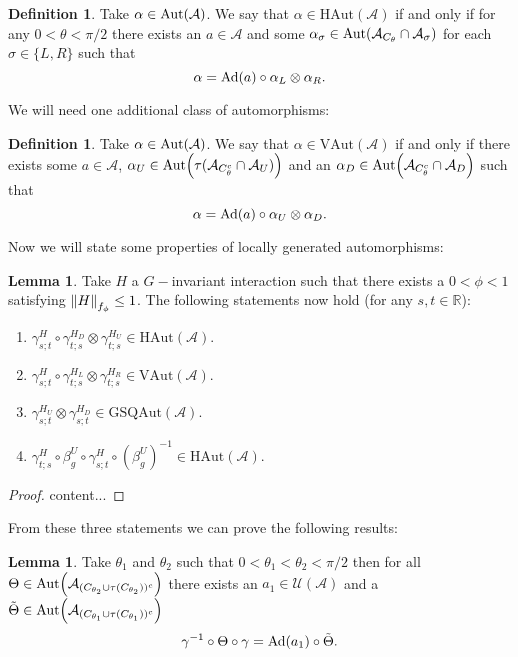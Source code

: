 \documentclass[12pt,a4paper,twoside]{article}
\let\originalleft\left
\let\originalright\right
\renewcommand{\left}{\mathopen{}\mathclose\bgroup\originalleft}
\renewcommand{\right}{\aftergroup\egroup\originalright}
\newcommand{\UU}{\mathcal U}
\renewcommand{\AA}{\mathcal A}
\newcommand{\RR}{\mathbb R}
\newcommand{\Ad}[1]{\textrm{Ad}\left(#1\right)}
\newcommand{\Aut}[1]{\textrm{Aut}\left(#1\right)}
\theoremstyle{definition}
\newtheorem{definition}[theorem]{Definition}
\newtheorem{lemma}[theorem]{Lemma}
\numberwithin{equation}{section}
\begin{document}
 \begin{definition}
 	Take $\alpha\in\Aut{\AA}$. We say that $\alpha\in\textrm{HAut}(\AA)$ if and only if for any $0<\theta<\pi/2$ there exists an $a\in\AA$ and some $\alpha_\sigma\in\Aut{\AA_{C_\theta}\cap\AA_\sigma}$ for each $\sigma\in\{L,R\}$ such that
 	\begin{equation}
 		\alpha=\Ad{a}\circ\alpha_L\otimes\alpha_R.
 	\end{equation}
 \end{definition}
We will need one additional class of automorphisms:
\begin{definition}
	Take $\alpha\in\Aut{\AA}$. We say that $\alpha\in\textrm{VAut}(\AA)$ if and only if there exists some $a\in\AA$, $\alpha_U\in\Aut{\tau(\AA_{C_\theta^c}\cap\AA_{U})}$ and an $\alpha_D\in\Aut{\AA_{C_\theta^c}\cap\AA_{D}}$ such that
	\begin{equation}
		\alpha=\Ad{a}\circ\alpha_U\otimes\alpha_D.
	\end{equation}
\end{definition}
Now we will state some properties of locally generated automorphisms:
\begin{lemma}\label{lem:PropertiesLocallyGeneratedAutomorphisms}
	Take $H$ a $G-$invariant interaction such that there exists a $0<\phi<1$ satisfying $\norm{H}_{f_\phi}\leq 1$. The following statements now hold (for any $s,t\in\RR$):
	\begin{enumerate}
		\item $\gamma^H_{s;t}\circ\gamma^{H_D}_{t;s}\otimes\gamma^{H_U}_{t;s}\in\textrm{HAut}(\AA)$.
		\item $\gamma^H_{s;t}\circ\gamma^{H_L}_{t;s}\otimes\gamma^{H_R}_{t;s}\in\textrm{VAut}(\AA)$.
		\item $\gamma^{H_U}_{s;t}\otimes\gamma^{H_D}_{s;t}\in\textrm{GSQAut}(\AA)$.
		\item $\gamma^{H}_{t;s}\circ\beta_g^U\circ\gamma^{H}_{s;t}\circ(\beta_g^U)^{-1}\in\textrm{HAut}(\AA)$.
	\end{enumerate}
\end{lemma}
\begin{proof}
	content...
\end{proof}
From these three statements we can prove the following results:
\begin{lemma}\label{lem:TwoAngleLemmaPart1}
	Take $\theta_1$ and $\theta_2$ such that $0<\theta_1<\theta_2<\pi/2$ then for all $\Theta\in\Aut{\AA_{(C_{\theta_2}\cup \tau(C_{\theta_2}))^c}}$ there exists an $a_1\in\UU(\AA)$ and a $\tilde{\Theta}\in \Aut{\AA_{(C_{\theta_1}\cup \tau(C_{\theta_1}))^c}}$
		\begin{equation}\label{eq:TwoAngleLemmaPart1Equation1}
			\gamma^{-1}\circ\Theta\circ\gamma=\Ad{a_1}\circ\tilde{\Theta}.
		\end{equation}
\end{lemma}
\end{document}
